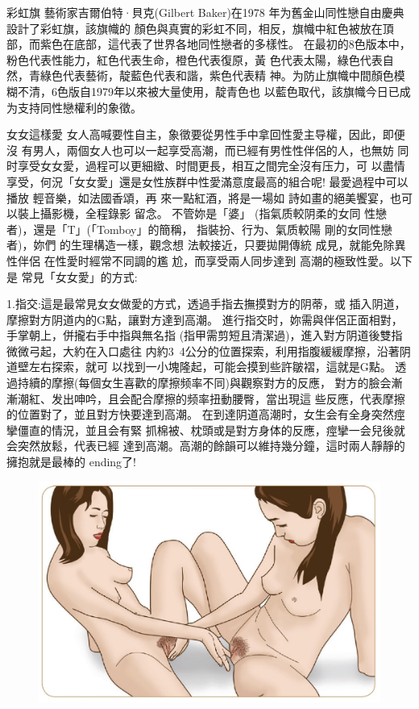 \documentclass[12pt,UTF8]{ctexbook}
\begin{document}
彩虹旗
藝術家吉爾伯特·貝克(Gilbert Baker)在1978
年为舊金山同性戀自由慶典設計了彩虹旗，該旗幟的
顏色與真實的彩虹不同，相反，旗幟中紅色被放在頂
部，而紫色在底部，這代表了世界各地同性戀者的多樣性。
在最初的8色版本中，粉色代表性能力，紅色代表生命，橙色代表復原，黃
色代表太陽，綠色代表自然，青綠色代表藝術，靛藍色代表和諧，紫色代表精
神。为防止旗幟中間顏色模糊不清，6色版自1979年以來被大量使用，靛青色也
以藍色取代，該旗幟今日已成为支持同性戀權利的象徵。

女女這樣愛
女人高喊要性自主，象徵要從男性手中拿回性愛主导權，因此，即便沒
有男人，兩個女人也可以一起享受高潮，而已經有男性性伴侶的人，也無妨
同时享受女女愛，過程可以更細緻、时間更長，相互之間完全沒有压力，可
以盡情享受，何況「女女愛」還是女性族群中性愛滿意度最高的組合呢!
最愛過程中可以播放
輕音樂，如法國香頌，再
來一點紅酒，將是一場如
詩如畫的絕美饗宴，也可
以裝上攝影機，全程錄影
留念。
不管妳是「婆」
(指氣质較阴柔的女同
性戀者)，還是「T」(「Tomboy」的簡稱，
指裝扮、行为、氣质較陽
剛的女同性戀者)，妳們
的生理構造一樣，觀念想
法較接近，只要拋開傳統
成見，就能免除異性伴侶
在性愛时經常不同調的尷
尬，而享受兩人同步達到
高潮的極致性愛。以下是
常見「女女愛」的方式:

1.指交:這是最常見女女做愛的方式，透過手指去撫摸對方的阴蒂，或
插入阴道，摩擦對方阴道内的G點，讓對方達到高潮。
進行指交时，妳需與伴侶正面相對，手掌朝上，併攏右手中指與無名指
(指甲需剪短且清潔過)，進入對方阴道後雙指微微弓起，大約在入口處往
内約3~4公分的位置探索，利用指腹緩緩摩擦，沿著阴道壁左右探索，就可
以找到一小塊隆起，可能会摸到些許皺褶，這就是G點。
透過持續的摩擦(每個女生喜歡的摩擦频率不同)與觀察對方的反應，
對方的臉会漸漸潮紅、发出呻吟，且会配合摩擦的频率扭動腰臀，當出現這
些反應，代表摩擦的位置對了，並且對方快要達到高潮。
在到達阴道高潮时，女生会有全身突然痙攣僵直的情況，並且会有緊
抓棉被、枕頭或是對方身体的反應，痙攣一会兒後就会突然放鬆，代表已經
達到高潮。高潮的餘韻可以維持幾分鐘，這时兩人靜靜的擁抱就是最棒的
ending了!

\begin{figure}[htbp]
	\centering
	\includegraphics[width=0.7\linewidth]{10}
	\caption{}
	\label{fig:1}
\end{figure}
\end{document}
